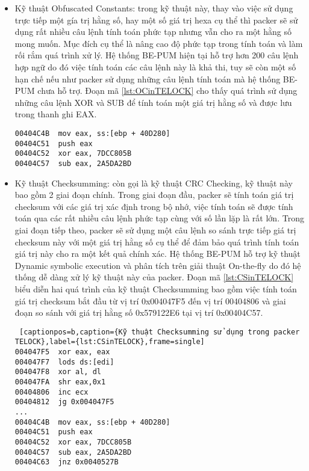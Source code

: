 \begin{itemize}
\item{Kỹ thuật Obfuscated Constants: trong kỹ thuật này, thay vào việc sử dụng trực tiếp một gía trị hằng số, hay một số giá trị hexa cụ thể thì packer sẽ sử dụng rất nhiều câu lệnh tính toán phức tạp nhưng vẫn cho ra một hằng số mong muốn. Mục đích cụ thể là nâng cao độ phức tạp trong tính toán và làm rối rắm quá trình xử lý. Hệ thống BE-PUM hiện tại hỗ trợ hơn 200 câu lệnh hợp ngữ do đó việc tính toán các câu lệnh này là khả thi, tuy sẽ còn một số hạn chế nếu như packer sử dụng những câu lệnh tính toán mà hệ thống BE-PUM chưa hỗ trợ. Đoạn mã \ref {lst:OCinTELOCK} cho thấy quá trình sử dụng những câu lệnh XOR và SUB để tính toán một giá trị hằng số và được lưu trong thanh ghi EAX. 
\begin{code}
\begin{lstlisting}[captionpos=b,caption={Kỹ thuật Obfuscated Constants sử dụng trong packer TELOCK},label={lst:OCinTELOCK},frame=single]
00404C4B  mov eax, ss:[ebp + 40D280] 
00404C51  push eax
00404C52  xor eax, 7DCC805B 
00404C57  sub eax, 2A5DA2BD
\end{lstlisting}
\end{code}
}
\item{Kỹ thuật Checksumming: còn gọi là kỹ thuật CRC Checking, kỹ thuật này bao gồm 2 giai đoạn chính. Trong giai đoạn đầu, packer sẽ tính toán giá trị checksum với các giá trị xác định trong bộ nhớ, việc tính toán sẽ được tính toán qua các rất nhiều câu lệnh phức tạp cùng với số lần lặp là rất lớn. Trong giai đoạn tiếp theo, packer sẽ sử dụng một câu lệnh so sánh trực tiếp giá trị checksum này với một giá trị hằng số cụ thể để đảm bảo quá trình tính toán giá trị này cho ra một kết quả chính xác. Hệ thống BE-PUM hỗ trợ kỹ thuật Dynamic symbolic execution và phân tích trên giải thuật On-the-fly do đó hệ thống dễ dàng xử lý kỹ thuật này của packer. Đoạn mã \ref {lst:CSinTELOCK} biểu diễn hai quá trình của kỹ thuật Checksumming bao gồm việc tính toán giá trị checksum bắt đầu từ vị trí 0x004047F5 đến vị trí 00404806 và giai đoạn so sánh với giá trị hằng số 0x579122E6 tại vị trí 0x00404C57. 
\begin{code}
\begin{lstlisting} [captionpos=b,caption={Kỹ thuật Checksumming sử dụng trong packer TELOCK},label={lst:CSinTELOCK},frame=single]
004047F5  xor eax, eax
004047F7  lods ds:[edi]
004047F8  xor al, dl
004047FA  shr eax,0x1
00404806  inc ecx
00404812  jg 0x004047F5
...
00404C4B  mov eax, ss:[ebp + 40D280]
00404C51  push eax
00404C52  xor eax, 7DCC805B 
00404C57  sub eax, 2A5DA2BD
00404C63  jnz 0x0040527B
\end{lstlisting}
\end{code}
}
\end{itemize}

